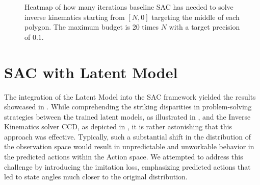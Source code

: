 \begin{figure}
    \begin{center}
        \hfill
        \hfill
    \end{center}
    \caption[SAC iteration heatmap]{Heatmap of how many iterations baseline SAC has needed to solve inverse kinematics starting from $[N, 0]$ targeting the middle of each polygon. The maximum budget is 20 times $N$ with a target precision of $0.1$.}
    \label{fig:SAC_baseline_min_distance_step}
\end{figure}

\section{SAC with Latent Model}

The integration of the Latent Model into the SAC framework yielded the results showcased in . While comprehending the striking disparities in problem-solving strategies between the trained latent models, as illustrated in , and the Inverse Kinematics solver CCD, as depicted in , it is rather astonishing that this approach was effective. Typically, such a substantial shift in the distribution of the observation space would result in unpredictable and unworkable behavior in the predicted actions within the Action space. We attempted to address this challenge by introducing the imitation loss, emphasizing predicted actions that led to state angles much closer to the original distribution.

